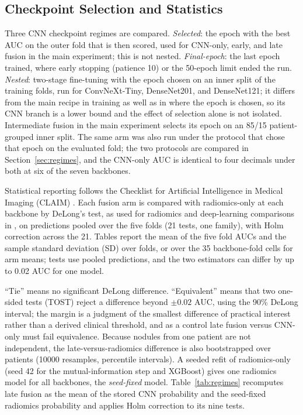 \documentclass[conference]{IEEEtran}
\begin{document}
\subsection{Checkpoint Selection and Statistics}\label{sec:integrity}
Three CNN checkpoint regimes are compared. \emph{Selected}: the epoch with the best AUC on the outer fold that is then scored, used for CNN-only, early, and late fusion in the main experiment; this is not nested. \emph{Final-epoch}: the last epoch trained, where early stopping (patience 10) or the 50-epoch limit ended the run. \emph{Nested}: two-stage fine-tuning with the epoch chosen on an inner split of the training folds, run for ConvNeXt-Tiny, DenseNet201, and DenseNet121; it differs from the main recipe in training as well as in where the epoch is chosen, so its CNN branch is a lower bound and the effect of selection alone is not isolated. Intermediate fusion in the main experiment selects its epoch on an 85/15 patient-grouped inner split. The same arm was also run under the protocol that chose that epoch on the evaluated fold; the two protocols are compared in Section~\ref{sec:regimes}, and the CNN-only AUC is identical to four decimals under both at six of the seven backbones.

Statistical reporting follows the Checklist for Artificial Intelligence in Medical Imaging (CLAIM) \cite{tejani_claim_2024}. Each fusion arm is compared with radiomics-only at each backbone by DeLong's test, as used for radiomics and deep-learning comparisons in \cite{astaraki_comparative_2021}, on predictions pooled over the five folds (21 tests, one family), with Holm correction across the 21. Tables report the mean of the five fold AUCs and the sample standard deviation (SD) over folds, or over the 35 backbone-fold cells for arm means; tests use pooled predictions, and the two estimators can differ by up to 0.02 AUC for one model.

``Tie'' means no significant DeLong difference. ``Equivalent'' means that two one-sided tests (TOST) reject a difference beyond $\pm0.02$ AUC, using the 90\% DeLong interval; the margin is a judgment of the smallest difference of practical interest rather than a derived clinical threshold, and as a control late fusion versus CNN-only must fail equivalence. Because nodules from one patient are not independent, the late-versus-radiomics difference is also bootstrapped over patients (10000 resamples, percentile intervals). A seeded refit of radiomics-only (seed 42 for the mutual-information step and XGBoost) gives one radiomics model for all backbones, the \emph{seed-fixed} model. Table~\ref{tab:regimes} recomputes late fusion as the mean of the stored CNN probability and the seed-fixed radiomics probability and applies Holm correction to its nine tests.
\end{document}
